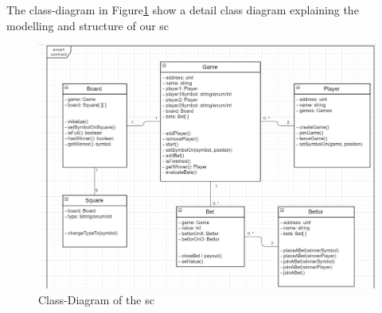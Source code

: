 The class-diagram in Figure\ref{fig:sc_uml}  show a detail class diagram explaining the modelling and structure of our \ac{sc}
	\begin{figure}[ht]
		\begin{center}
			\includegraphics[scale=0.22]{res/sc_uml}
		\end{center}
		\caption{Class-Diagram of the \ac{sc}}
		\label{fig:sc_uml}
	\end{figure}
